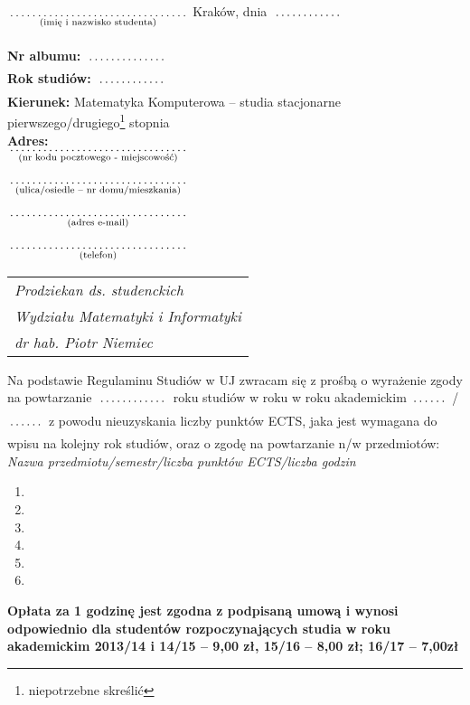 \documentclass[a4paper,11pt]{article}
\newcommand{\fillField}[2]{
    $\underset{\text{#1}}{\parbox[t]{#2}{\dotfill}}$
}
\begin{document}
\noindent
\fillField{(imię i nazwisko studenta)}{5cm} \hfill Kraków, dnia \fillField{}{2cm} \\\\
\textbf{Nr albumu:}   \fillField{}{2.3cm}\\
\textbf{Rok studiów:} \fillField{}{2cm}\\
\textbf{Kierunek:} Matematyka Komputerowa -- studia stacjonarne pierwszego/drugiego\footnote[1]{niepotrzebne skreślić} stopnia\\
\textbf{Adres:}\\
\fillField{(nr kodu pocztowego - miejscowość)}{5cm}\\\\
\fillField{(ulica/osiedle – nr domu/mieszkania)}{5cm}\\\\
\fillField{(adres e-mail)}{5cm}\\\\
\fillField{(telefon)}{5cm}
\phantom{a}\hfill
\begin{tabular}[c]{@{}l@{}}
\textit{Prodziekan ds. studenckich} \\
\textit{Wydziału Matematyki i Informatyki}\\
\textit{dr hab. Piotr Niemiec}
\end{tabular}

\vskip 1.0cm


Na podstawie Regulaminu Studiów w UJ zwracam się z prośbą o wyrażenie zgody na powtarzanie \fillField{}{2cm} roku studiów w roku
w roku akademickim \fillField{}{1cm}/\fillField{}{1cm} z powodu nieuzyskania liczby punktów ECTS, jaka jest wymagana do wpisu na kolejny
rok studiów, oraz o zgodę na powtarzanie n/w przedmiotów:\\

\noindent
\textit{Nazwa przedmiotu/semestr/liczba punktów ECTS/liczba godzin}
\begin{enumerate}
    \item \dotfill
    \item \dotfill
    \item \dotfill
    \item \dotfill
    \item \dotfill
    \item \dotfill
\end{enumerate}
{\footnotesize \bf Opłata za 1 godzinę jest zgodna z podpisaną umową i wynosi odpowiednio dla studentów rozpoczynających studia w roku akademickim 2013/14 i 14/15 – 9,00 zł, 15/16 – 8,00 zł; 16/17 – 7,00zł}\\
\end{document}
